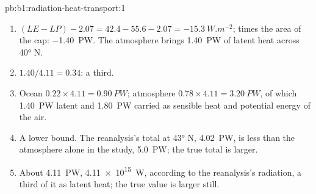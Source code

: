 \begin{solution}{pb:b1:radiation-heat-transport:1}
\begin{enumerate}
  \item $(LE - LP) - 2.07 = 42.4 - 55.6 - 2.07 = \qty{-15.3}{W.m^{-2}}$; times the
        area of the cap: \qty{-1.40}{PW}. The atmosphere brings \qty{1.40}{PW}
        of latent heat across \ang{40} N.
  \item $1.40/4.11 = 0.34$: a third.
  \item Ocean $0.22 \times 4.11 = \qty{0.90}{PW}$; atmosphere $0.78 \times 4.11 =
        \qty{3.20}{PW}$, of which \qty{1.40}{PW} latent and \qty{1.80}{PW}
        carried as sensible heat and potential energy of the air.
  \item A lower bound. The reanalysis's total at \ang{43} N, \qty{4.02}{PW}, is less
        than the atmosphere alone in the study, \qty{5.0}{PW}; the true total is
        larger.
  \item About \qty{4.11}{PW}, \qty{4.11e15}{W}, according to the reanalysis's
        radiation, a third of it as latent heat; the true value is larger still.
\end{enumerate}
\end{solution}
